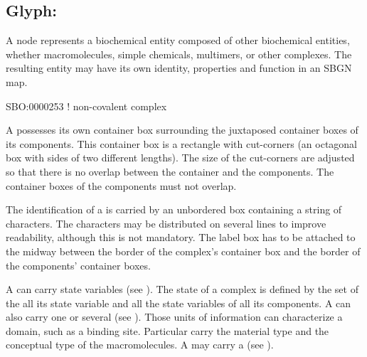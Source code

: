 

\subsection{Glyph: }\label{sec:complex}

A  node represents a biochemical entity composed of other biochemical entities, whether macromolecules, simple chemicals, multimers, or other complexes.  The resulting entity may have its own identity, properties and function in an SBGN map.

\begin{glyphDescription}

\glyphSboTerm SBO:0000253 ! non-covalent complex

\glyphContainer A  possesses its own container box surrounding the juxtaposed container boxes of its components.  This container box is a rectangle with cut-corners (an octagonal box with sides of two different lengths).  The size of the cut-corners are adjusted so that there is no overlap between the container and the components.  The container boxes of the components must not overlap.

\glyphLabel The identification of a  is carried by an unbordered box containing a string of characters.  The characters may be distributed on several lines to improve readability, although this is not mandatory.  The label box has to be attached to the midway between the border of the complex's container box and the border of the components' container boxes.

\glyphAux A  can carry state variables (see ).  The state of a complex is defined by the set of the all its state variable and all the state variables of all its components.  A  can also carry one or several  (see ).  Those units of information can characterize a domain, such as a binding site.  Particular  carry the material type and the conceptual type of the macromolecules.  A  may carry a  (see ).

\end{glyphDescription}


